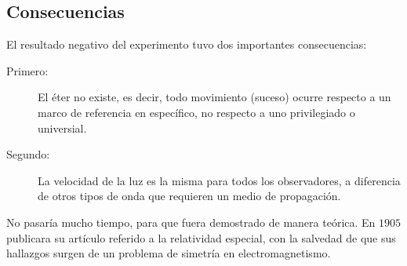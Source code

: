 \subsection{Consecuencias}

El resultado negativo del experimento tuvo dos importantes consecuencias:
	\begin{description}
		\item[Primero: ] El éter no existe, es decir, todo movimiento (suceso) ocurre  respecto a un marco de referencia en específico, no respecto a uno privilegiado o universial.
		\item[Segundo: ] La velocidad de la luz es la misma para todos los observadores, a diferencia de otros tipos de onda que requieren un medio de propagación.
	\end{description}
No pasaría mucho tiempo, para que fuera demostrado de manera teórica. En $1905$ publicara su artículo referido a la relatividad especial, con la salvedad de que sus hallazgos surgen de un problema de simetría en electromagnetismo.